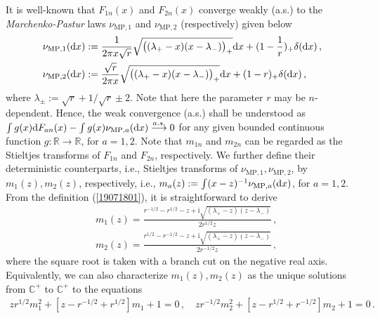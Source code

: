\documentclass[12pt]{article}
\numberwithin{equation}{section}
\theoremstyle{remark}
\newcommand{\1}{{\rm 1}\kern-0.24em{\rm I}}
\begin{document}
It is well-known %
that $F_{1n}(x)$ and $F_{2n}(x)$ converge weakly (a.s.) to the {\it Marchenko-Pastur} laws 
$\nu_{\text{MP},1}$ and $\nu_{\text{MP},2}$ (respectively) given below
\begin{align}
&\nu_{\text{MP},1}({\rm d}x):=\frac{1}{2\pi x \sqrt r}\sqrt{\big((\lambda_+-x)(x-\lambda_-)\big)_+}{\rm d}x+(1-\frac{1}{ r})_+\delta({\rm d}x)\,,\nonumber\\
&\nu_{\text{MP},2}({\rm d}x):=\frac{\sqrt r}{2\pi x}\sqrt{\big((\lambda_+-x)(x-\lambda_-)\big)_+}{\rm d}x+(1-r)_+\delta({\rm d}x)\,, \label{19071801}
\end{align}
where $\lambda_{\pm}:=\sqrt r+ 1/\sqrt r \pm 2$.  Note that here the parameter $r$ may be $n$-dependent. Hence, the weak convergence (a.s.) shall be understood as $\int g(x) {\rm d} F_{an}(x)-\int g(x) \nu_{\text{MP},a}({\rm d}x) \stackrel{a.s.} \longrightarrow 0 $ for any given bounded continuous function $g:\mathbb{R}\to \mathbb{R}$, for $a=1,2$.  %
Note that $m_{1n}$ and $m_{2n}$ can be regarded as the Stieltjes transforms of $F_{1n}$ and $F_{2n}$, respectively.  We further define their deterministic counterparts, i.e.,  Stieltjes transforms of $\nu_{\text{MP},1},\nu_{\text{MP},2}$,  by $m_1(z),m_2(z)$,  respectively, i.e., $m_a(z):=\int (x-z)^{-1}\nu_{\text{MP},a}({\rm d}x)$, for $a=1,2$.
 From the definition (\ref{19071801}), it is straightforward to derive  
 \begin{align}
&m_1(z)=\frac{r^{-1/2}-r^{1/2} - z+\mathrm{i}\sqrt{(\lambda_+-z)(z-\lambda_-)}}{2r^{1/2}z}\,,  \nonumber\\
&m_2(z)=\frac{r^{1/2}-r^{-1/2} - z+\mathrm{i}\sqrt{(\lambda_+-z)(z-\lambda_-)}}{2r^{-1/2}z}\,, \label{m1m2}
 \end{align}
where the square root is taken with a branch cut on the negative real axis. Equivalently, we can also characterize $m_1(z),m_2(z)$ as the unique solutions from $\mathbb{C}^+$ to $\mathbb{C}^+$ to the equations
\begin{align}
zr^{1/2}m_1^2+[z-r^{-1/2}+r^{1/2}]m_1+1=0\,, \quad  z r^{-1/2}m_2^2+[z-r^{1/2}+r^{-1/2}]m_2+1=0\,. \label{selfconeqt}
\end{align} 
\end{document}
